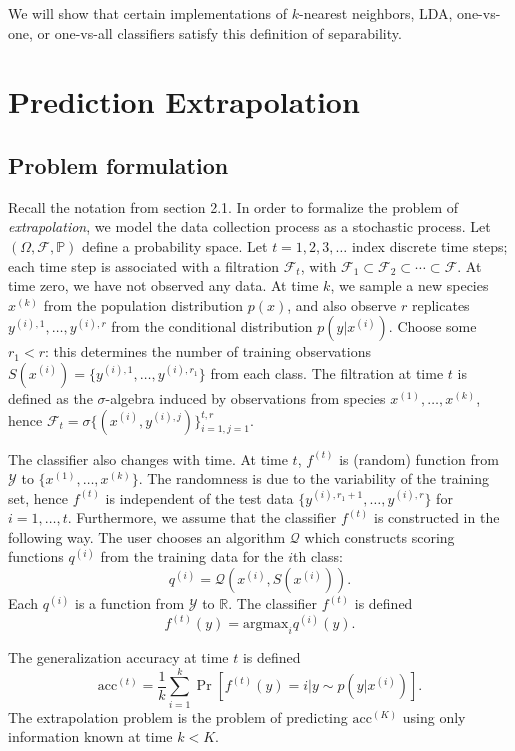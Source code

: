 \documentclass{article}
\newcommand{\argmax}{\text{argmax}}
\begin{document}
We will show that certain implementations of $k$-nearest neighbors, LDA, one-vs-one, or one-vs-all classifiers satisfy this definition of separability.



\section{Prediction Extrapolation}

\subsection{Problem formulation}

Recall the notation from section 2.1. In order to formalize the problem of \emph{extrapolation}, we model
the data collection process as a stochastic process.  Let $(\Omega,
\mathcal{F}, \mathbb{P})$ define a probability space.  Let $t = 1, 2,
3, \hdots $ index discrete time steps; each time step is associated
with a filtration $\mathcal{F}_t$, with $\mathcal{F}_1 \subset
\mathcal{F}_2 \subset \cdots \subset \mathcal{F}$.  At time zero, we
have not observed any data.  At time $k$, we sample a new species
$x^{(k)}$ from the population distribution $p(x)$, and also observe
$r$ replicates $y^{(i), 1}, \hdots, y^{(i), r}$ from the conditional
distribution $p(y|x^{(i)})$.  Choose some $r_1 < r$: this determines
the number of training observations $S(x^{(i)}) = \{y^{(i), 1},\hdots,
y^{(i), r_1}\}$ from each class.  The filtration at time $t$ is
defined as the $\sigma$-algebra induced by observations from species
$x^{(1)}, \hdots, x^{(k)}$, hence $\mathcal{F}_t = \sigma\{(x^{(i)},
y^{(i), j})\}_{i=1, j=1}^{t, r}$.

The classifier also changes with time.  At time $t$, $f^{(t)}$ is
(random) function from $\mathcal{Y}$ to $\{x^{(1)}, \hdots,
x^{(k)}\}$.  The randomness is due to the variability of the training
set, hence $f^{(t)}$ is independent of the test data $\{y^{(i), r_1 +
  1}, \hdots, y^{(i), r}\}$ for $i = 1,\hdots, t$.  Furthermore, we
assume that the classifier $f^{(t)}$ is constructed in the following
way.  The user chooses an algorithm $\mathcal{Q}$ which constructs
scoring functions $q^{(i)}$ from the training data for the $i$th
class:
\[
q^{(i)} = \mathcal{Q}(x^{(i)}, S(x^{(i)})).
\]
Each $q^{(i)}$ is a function from $\mathcal{Y}$ to $\mathbb{R}$.  The
classifier $f^{(t)}$ is defined
\[
f^{(t)}(y) = \argmax_i q^{(i)}(y).
\]


The generalization accuracy at time $t$ is defined
\[
\text{acc}^{(t)} = \frac{1}{k}\sum_{i=1}^k \Pr[f^{(t)}(y) = i|y \sim p(y|x^{(i)})].
\]
The extrapolation problem is the problem of predicting $\text{acc}^{(K)}$ using
only information known at time $k < K$.
\end{document}
